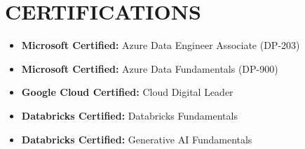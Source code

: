 \documentclass[10pt,letterpaper]{article}
\begin{document}
\section{CERTIFICATIONS}
\begin{itemize}[leftmargin=*,nosep,itemsep=2pt]
    \item \textbf{Microsoft Certified:} Azure Data Engineer Associate (DP-203)
    \item \textbf{Microsoft Certified:} Azure Data Fundamentals (DP-900)
    \item \textbf{Google Cloud Certified:} Cloud Digital Leader
    \item \textbf{Databricks Certified:} Databricks Fundamentals
    \item \textbf{Databricks Certified:} Generative AI Fundamentals
\end{itemize}
\end{document}
